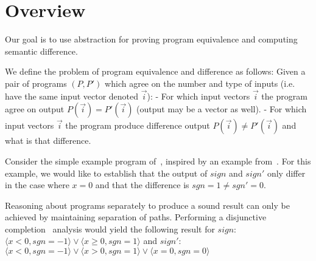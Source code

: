 \section{Overview}

Our goal is to use abstraction for proving program equivalence and computing semantic difference.

We define the problem of program equivalence and difference as follows: Given a pair of programs $(P,P')$ which agree on the number and type of inputs (i.e. have the same input vector denoted $\vec{i}$):
- For which input vectors $\vec{i}$ the program agree on output $P(\vec{i}) = P'(\vec{i})$ (output may be a vector as well).
- For which input vectors $\vec{i}$ the program produce difference output $P(\vec{i}) \neq P'(\vec{i})$ and what is that difference.



Consider the simple example program of~, inspired by an example from~\cite{RM:TOPLAS07}. For this example, we would like to establish that the output of $sign$ and $sign'$ only differ in the case where $x=0$ and that the difference is $sgn = 1 \neq sgn' = 0$.

Reasoning about programs separately to produce a sound result can only be achieved by maintaining separation of paths. Performing a disjunctive completion~\cite{TODO} analysis would yield the following result for $sign$: $\langle x < 0, sgn = -1 \rangle \vee  \langle x \geq 0, sgn = 1 \rangle$ and $sign'$: $\langle x < 0, sgn = -1 \rangle \vee  \langle x > 0, sgn = 1 \rangle \vee  \langle x = 0, sgn = 0 \rangle$ 